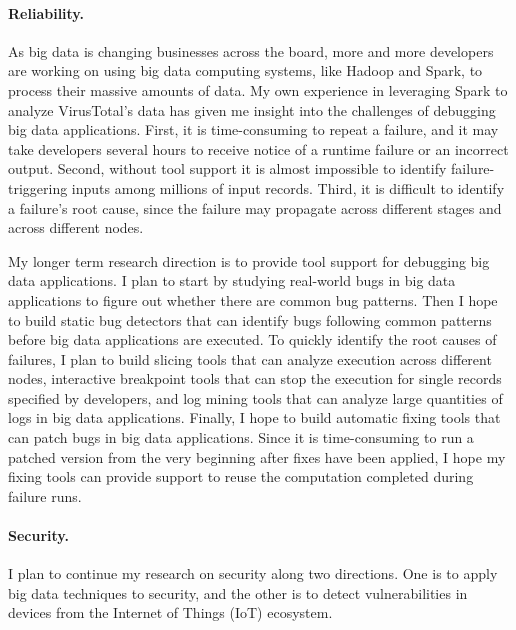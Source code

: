 \documentclass[10pt]{article}
\begin{document}
\vspace{-.1in}
\paragraph{Reliability.} 
As big data is changing businesses across the board, 
more and more developers are working on using big data computing systems, 
like Hadoop and Spark, to process their massive amounts of data. 
My own experience in leveraging Spark to analyze VirusTotal's data 
has given me insight into the challenges of debugging big data applications. 
First, it is time-consuming to repeat a failure, and it may take developers several hours to receive notice of a runtime failure or an incorrect output.
Second, without tool support it is almost impossible to identify failure-triggering inputs among millions of input records. 
Third, it is difficult to identify a failure's root cause, since the failure may propagate across different stages and across different nodes.

My longer term research direction is to provide tool support for debugging big data applications.
I plan to start by studying real-world bugs in big data applications to figure out whether there are common bug patterns. 
Then I hope to build static bug detectors that can identify bugs following common patterns before big data applications are executed.  
To quickly identify the root causes of failures, I plan to build slicing tools that can analyze execution across different nodes, 
interactive breakpoint tools that can stop the execution for single records specified by developers,
and log mining tools that can analyze large quantities of logs in big data applications.
Finally, I hope to build automatic fixing tools that can patch bugs in big data applications.
Since it is time-consuming to run a patched version from the very beginning after fixes have been applied, 
I hope my fixing tools can provide support to reuse the computation completed during failure runs.  


\vspace{-.1in}
\paragraph{Security.} 

I plan to continue my research on security along two directions. 
One is to apply big data techniques to security, 
and the other is to detect vulnerabilities in devices from the Internet of Things (IoT) ecosystem.
\end{document}
